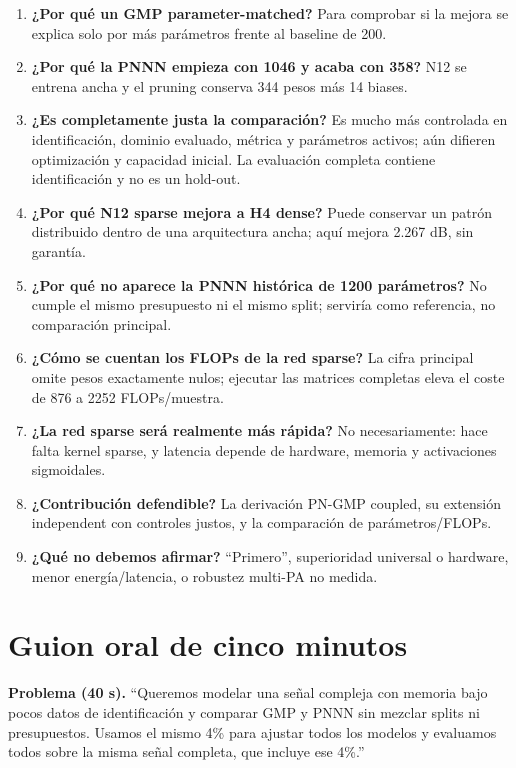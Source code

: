 \documentclass[10pt,a4paper]{article}
\begin{document}
\begin{enumerate}[leftmargin=*,label=\textbf{\arabic*.}]
$h=\alpha+j\beta$ contiene dos escalares reales libres.
\item \textbf{¿Por qué un GMP parameter-matched?} Para comprobar si la mejora se
explica solo por más parámetros frente al baseline de 200.
\item \textbf{¿Por qué la PNNN empieza con 1046 y acaba con 358?} N12 se entrena
ancha y el pruning conserva 344 pesos más 14 biases.
\item \textbf{¿Es completamente justa la comparación?} Es mucho más controlada
en identificación, dominio evaluado, métrica y parámetros activos; aún difieren
optimización y capacidad inicial. La evaluación completa contiene identificación
y no es un hold-out.
\item \textbf{¿Por qué N12 sparse mejora a H4 dense?} Puede conservar un patrón
distribuido dentro de una arquitectura ancha; aquí mejora 2.267 dB, sin garantía.
\item \textbf{¿Por qué no aparece la PNNN histórica de 1200 parámetros?} No cumple
el mismo presupuesto ni el mismo split; serviría como referencia, no comparación
principal.
\item \textbf{¿Cómo se cuentan los FLOPs de la red sparse?} La cifra principal
omite pesos exactamente nulos; ejecutar las matrices completas eleva el coste de
876 a 2252 FLOPs/muestra.
\item \textbf{¿La red sparse será realmente más rápida?} No necesariamente: hace
falta kernel sparse, y latencia depende de hardware, memoria y activaciones sigmoidales.
\item \textbf{¿Contribución defendible?} La derivación PN-GMP coupled, su extensión
independent con controles justos, y la comparación de parámetros/FLOPs.
\item \textbf{¿Qué no debemos afirmar?} ``Primero'', superioridad universal o
hardware, menor energía/latencia, o robustez multi-PA no medida.
\end{enumerate}

\section{Guion oral de cinco minutos}

\textbf{Problema (40 s).} ``Queremos modelar una señal compleja con memoria bajo
pocos datos de identificación y comparar GMP y PNNN sin mezclar splits ni
presupuestos. Usamos el mismo 4\% para ajustar todos los modelos y evaluamos
todos sobre la misma señal completa, que incluye ese 4\%.''
\end{document}
